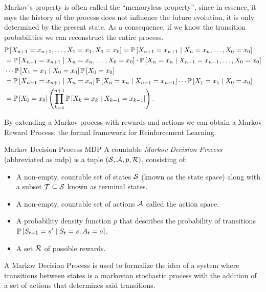 Markov's property is often called the ``memoryless property'', since in essence,
it says the history of the process does not influence the future evolution, it
is only determined by the present state. As a consequence, if we know the
transition probabilities we can reconstruct the entire process.
\begin{align}
    \label{eq:markov-sequence}
    & \mathbb{P}\left[X_{n+1} = x_{n+1}, \dots, X_1 = x_1, X_0 = x_0\right] = \mathbb{P}\left[X_{n+1} = x_{n+1} \mid X_n = x_n, \dots, X_0 = x_0\right] \nonumber \\
    &= \mathbb{P}\left[X_{n+1} = x_{n+1} \mid X_{n} = x_n, \dots, X_0 = x_0\right] \cdot \mathbb{P}\left[X_n = x_n \mid X_{n-1} = x_{n-1}, \dots, X_0 = x_0\right] \nonumber \\
    &\cdots \mathbb{P}\left[X_1 = x_1 \mid X_0 = x_0\right] \mathbb{P}\left[X_0 = x_0\right] \nonumber \\
    &= \mathbb{P}\left[X_{n+1} = x_{n+1} \mid X_n = x_n\right] \mathbb{P}\left[X_n = x_n \mid X_{n-1} = x_{n-1}\right] \cdots \mathbb{P}\left[X_1 = x_1 \mid X_0 = x_0\right] \nonumber \\
    &= \mathbb{P}\left[X_0 = x_0\right] \left( \prod_{k=1}^{n+1} \mathbb{P}\left[X_k = x_k \mid X_{k-1} = x_{k-1}\right] \right).
\end{align}

By extending a Markov process with rewards and actions we can obtain a Markov
Reward Process: the formal framework for Reinforcement Learning.

\begin{dfn}{Markov Decision Process \cite[Lec.~2]{silver2015}}{MDP}
    A countable \emph{Markov Decision Process} (abbreviated as \ac{mdp}) is a tuple
    $(\mathcal{S}, \mathcal{A}, p, \mathcal{R})$, consisting of:
    \begin{itemize}
        \item A non-empty, countable set of states $\mathcal{S}$ (known as the state
            space) along with a subset $\mathcal{T} \subseteq \mathcal{S}$ known as
            terminal states. 
        \item A non-empty, countable set of actions $\mathcal{A}$ called the action
            space.
        \item A probability density function $p$ that describes the probability
            of transitions $\mathbb{P}\left[S_{t+1} = s' \mid S_t = s, A_t = a\right]$.
        \item A set $\mathcal{R}$ of possible rewards.
    \end{itemize}
\end{dfn}

A Markov Decision Process is used to formalize the idea of a system where
transitions between states is a markovian stochastic process with the addition
of a set of actions that determines said transitions. 